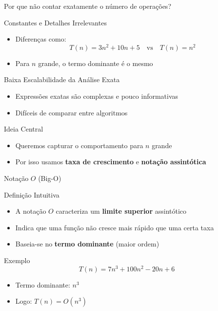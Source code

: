 \documentclass{beamer}
\begin{document}
\begin{frame}{Por que não contar exatamente o número de operações?}

\begin{block}{Constantes e Detalhes Irrelevantes}
\begin{itemize}
    \item Diferenças como:
    \[
    T(n) = 3n^2 + 10n + 5 \quad \text{vs} \quad T(n) = n^2
    \]
    \item Para $n$ grande, o termo dominante é o mesmo
\end{itemize}
\end{block}

\vspace{0.2cm}

\begin{block}{Baixa Escalabilidade da Análise Exata}
\begin{itemize}
    \item Expressões exatas são complexas e pouco informativas
    \item Difíceis de comparar entre algoritmos
\end{itemize}
\end{block}

\vspace{0.2cm}

\begin{alertblock}{Ideia Central}
\begin{itemize}
    \item Queremos capturar o comportamento para $n$ grande
    \item Por isso usamos \textbf{taxa de crescimento} e \textbf{notação assintótica}
\end{itemize}
\end{alertblock}

\end{frame}
\begin{frame}{Notação $O$ (Big-O)}

\begin{block}{Definição Intuitiva}
\begin{itemize}
    \item A notação $O$ caracteriza um \textbf{limite superior} assintótico
    \item Indica que uma função não cresce mais rápido que uma certa taxa
    \item Baseia-se no \textbf{termo dominante} (maior ordem)
\end{itemize}
\end{block}

\vspace{0.2cm}

\begin{block}{Exemplo}
\[
T(n) = 7n^3 + 100n^2 - 20n + 6
\]

\begin{itemize}
    \item Termo dominante: $n^3$
    \item Logo: $T(n) = O(n^3)$
\end{itemize}
\end{block}

\end{frame}
\end{document}
